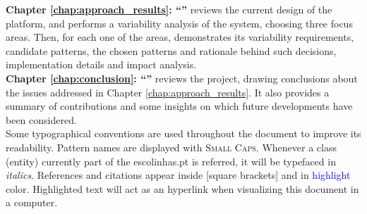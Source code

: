 \textbf{Chapter \ref{chap:approach_results}: ``'' } reviews the current design of the platform, and performs a variability analysis of the system, choosing three focus areas. Then, for each one of the areas, demonstrates its variability requirements, candidate patterns, the chosen patterns and rationale behind such decisions, implementation details and impact analysis.\\


\textbf{Chapter \ref{chap:conclusion}: ``'' } reviews the project, drawing conclusions about the issues addressed in Chapter \ref{chap:approach_results}. It also provides a summary of contributions and some insights on which future developments have been considered.\\

Some typographical conventions are used throughout the document to improve its readability. Pattern names are displayed with \textsc{Small Caps}. Whenever a class (entity) currently part of the escolinhas.pt is referred, it will be typefaced in \textit{italics}. References and citations appear inside [square brackets] and in \textcolor{blue}{highlight} color. Highlighted text will act as an hyperlink when visualizing this document in a computer.

